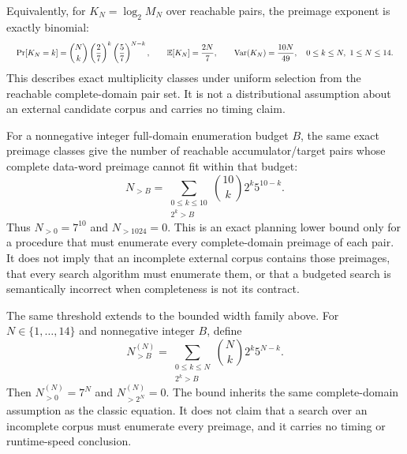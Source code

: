 \documentclass{article}
\newcommand{\fitmath}[1]{\resizebox{0.99\linewidth}{!}{$\displaystyle #1$}}
\begin{document}
Equivalently, for $K_N=\log_2 M_N$ over reachable pairs, the preimage exponent
is exactly binomial:
\begin{equation}
  \fitmath{%
    \Pr[K_N=k]
      = \binom{N}{k}\left(\frac{2}{7}\right)^k
        \left(\frac{5}{7}\right)^{N-k},\qquad
    \mathbb{E}[K_N]=\frac{2N}{7},\qquad
    \operatorname{Var}(K_N)=\frac{10N}{49},
    \quad 0\leq k\leq N,\ 1\leq N\leq14.
  }
  \label{eq:optimization-crazy-profile-log-preimage-binomial}
\end{equation}
This describes exact multiplicity classes under uniform selection from the
reachable complete-domain pair set. It is not a distributional assumption about
an external candidate corpus and carries no timing claim.

For a nonnegative integer full-domain enumeration budget $B$, the same exact
preimage classes give the number of reachable accumulator/target pairs whose
complete data-word preimage cannot fit within that budget:
\begin{equation}
  N_{>B}
    = \sum_{\substack{0\leq k\leq10\\ 2^k>B}}
      \binom{10}{k}2^k5^{10-k}.
  \label{eq:optimization-crazy-preimage-budget-exceedance}
\end{equation}
Thus $N_{>0}=7^{10}$ and $N_{>1024}=0$. This is an exact planning lower bound
only for a procedure that must enumerate every complete-domain preimage of each
pair. It does not imply that an incomplete external corpus contains those
preimages, that every search algorithm must enumerate them, or that a budgeted
search is semantically incorrect when completeness is not its contract.

The same threshold extends to the bounded width family above. For
$N\in\{1,\ldots,14\}$ and nonnegative integer $B$, define
\begin{equation}
  N^{(N)}_{>B}
    = \sum_{\substack{0\leq k\leq N\\ 2^k>B}}
      \binom{N}{k}2^k5^{N-k}.
  \label{eq:optimization-crazy-profile-preimage-budget-exceedance}
\end{equation}
Then $N^{(N)}_{>0}=7^N$ and $N^{(N)}_{>2^N}=0$. The bound inherits the
same complete-domain assumption as the classic equation. It does not claim that
a search over an incomplete corpus must enumerate every preimage, and it carries
no timing or runtime-speed conclusion.
\end{document}

